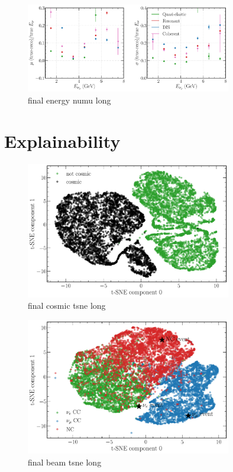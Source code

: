 \begin{figure} %
    \includegraphics[width=0.8\textwidth]{diagrams/7-cvn/chipsnet/final_energy_numu.pdf}
    \caption[final energy numu short]
    {final energy numu long}
    \label{fig:final_energy_numu}
\end{figure}

\section{Explainability} %
\label{sec:cvn_explain} %

\begin{figure} %
    \includegraphics[width=0.8\textwidth]{diagrams/7-cvn/chipsnet/final_cosmic_tsne.pdf}
    \caption[final cosmic tsne short]
    {final cosmic tsne long}
    \label{fig:final_cosmic_tsne}
\end{figure}

\begin{figure} %
    \includegraphics[width=0.8\textwidth]{diagrams/7-cvn/chipsnet/final_beam_tsne.pdf}
    \caption[final beam tsne short]
    {final beam tsne long}
    \label{fig:final_beam_tsne}
\end{figure}


